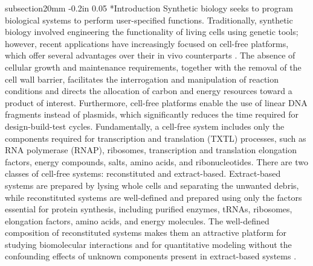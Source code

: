 \documentclass[12pt]{article}
\makeatletter
\renewcommand\section{\@startsection
	{subsection}{2}{0mm}
	{-0.2in}
	{0.05\baselineskip}
	{\normalfont\large\bfseries}}
\makeatother
\begin{document}
\section*{Introduction}
Synthetic biology seeks to program biological systems to perform user-specified functions. Traditionally, synthetic biology involved engineering the functionality of living cells using genetic tools; however, recent applications have increasingly focused on cell-free platforms, which offer several advantages over their in vivo counterparts \cite{Swartz2018,silverman2020cell,Bundy_2018,CFPS-Review-2020,garenne2021cell,moore2017cell,hunt2025cellfree}. The absence of cellular growth and maintenance requirements, together with the removal of the cell wall barrier, facilitates the interrogation and manipulation of reaction conditions and directs the allocation of carbon and energy resources toward a product of interest. Furthermore, cell-free platforms enable the use of linear DNA fragments instead of plasmids, which significantly reduces the time required for design-build-test cycles. Fundamentally, a cell-free system includes only the components required for transcription and translation (TXTL) processes, such as RNA polymerase (RNAP), ribosomes, transcription and translation elongation factors, energy compounds, salts, amino acids, and ribonucleotides. There are two classes of cell-free systems: reconstituted and extract-based. Extract-based systems are prepared by lysing whole cells and separating the unwanted debris, while reconstituted systems are well-defined and prepared using only the factors essential for protein synthesis, including purified enzymes, tRNAs, ribosomes, elongation factors, amino acids, and energy molecules. The well-defined composition of reconstituted systems makes them an attractive platform for studying biomolecular interactions and for quantitative modeling without the confounding effects of unknown components present in extract-based systems \cite{Vilkhovoy:2018aa,Horvath2020,karzbrun2011coarse}.
\end{document}
